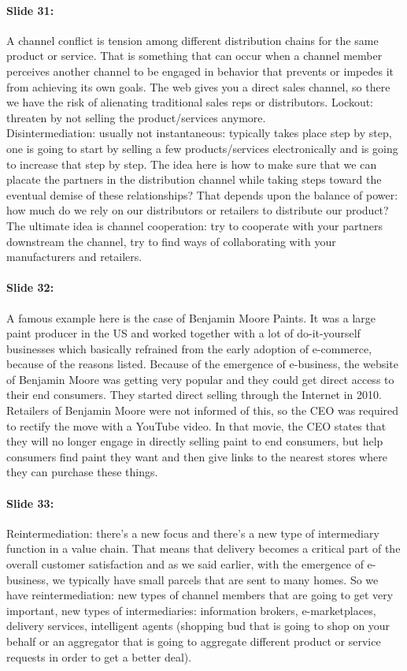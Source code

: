 \documentclass[10pt,a4paper]{report}
\begin{document}
\paragraph{Slide 31:}A channel conflict is tension among different distribution chains for the same product or service. That is something that can occur when a channel member perceives another channel to be engaged in behavior that prevents or impedes it from achieving its own goals. The web gives you a direct sales channel, so there we have the risk of alienating traditional sales reps or distributors. Lockout: threaten by not selling the product/services anymore.\\
Disintermediation: usually not instantaneous: typically takes place step by step, one is going to start by selling a few products/services electronically and is going to increase that step by step. The idea here is how to make sure that we can placate the partners in the distribution channel while taking steps toward the eventual demise of these relationships? That depends upon the balance of power: how much do we rely on our distributors or retailers to distribute our product?\\
The ultimate idea is channel cooperation: try to cooperate with your partners downstream the channel, try to find ways of collaborating with your manufacturers and retailers.

\paragraph{Slide 32:}A famous example here is the case of Benjamin Moore Paints. It was a large paint producer in the US and worked together with a lot of do-it-yourself businesses which basically refrained from the early adoption of e-commerce, because of the reasons listed. Because of the emergence of e-business, the website of Benjamin Moore was getting very popular and they could get direct access to their end consumers. They started direct selling through the Internet in 2010. Retailers of Benjamin Moore were not informed of this, so the CEO was required to rectify the move with a YouTube video. In that movie, the CEO states that they will no longer engage in directly selling paint to end consumers, but help consumers find paint they want and then give links to the nearest stores where they can purchase these things.

\paragraph{Slide 33:}Reintermediation: there's a new focus and there's a new type of intermediary function in a value chain. That means that delivery becomes a critical part of the overall customer satisfaction and as we said earlier, with the emergence of e-business, we typically have small parcels that are sent to many homes. So we have reintermediation: new types of channel members that are going to get very important, new types of intermediaries: information brokers, e-marketplaces, delivery services, intelligent agents (shopping bud that is going to shop on your behalf or an aggregator that is going to aggregate different product or service requests in order to get a better deal).
\end{document}
